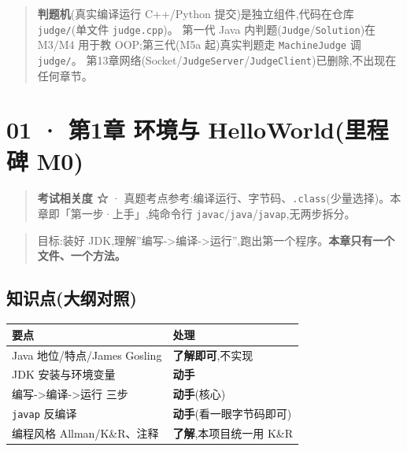 \documentclass[
  11pt,
]{ctexart}
\begin{document}
\begin{quote}
\textbf{判题机}(真实编译运行 C++/Python 提交)是独立组件,代码在仓库
\texttt{judge/}(单文件 \texttt{judge.cpp})。 第一代 Java
内判题(\texttt{Judge}/\texttt{Solution})在 M3/M4 用于教 OOP;第三代(M5a
起)真实判题走 \texttt{MachineJudge} 调 \texttt{judge/}。
第13章网络(Socket/\texttt{JudgeServer}/\texttt{JudgeClient})已删除,不出现在任何章节。
\end{quote}

\hypertarget{ux7b2c1ux7ae0-ux73afux5883ux4e0e-helloworldux91ccux7a0bux7891-m0}{%
\section{01 · 第1章 环境与 HelloWorld(里程碑
M0)}\label{ux7b2c1ux7ae0-ux73afux5883ux4e0e-helloworldux91ccux7a0bux7891-m0}}

\begin{quote}
\textbf{考试相关度 ☆} ·
真题考点参考:编译运行、字节码、\texttt{.class}(少量选择)。本章即「第一步·上手」,纯命令行
\texttt{javac}/\texttt{java}/\texttt{javap},无两步拆分。
\end{quote}

\begin{quote}
目标:装好
JDK,理解''编写-\textgreater 编译-\textgreater 运行'',跑出第一个程序。\textbf{本章只有一个文件、一个方法。}
\end{quote}

\hypertarget{ux77e5ux8bc6ux70b9ux5927ux7eb2ux5bf9ux7167}{%
\subsection{知识点(大纲对照)}\label{ux77e5ux8bc6ux70b9ux5927ux7eb2ux5bf9ux7167}}

\begin{longtable}[]{@{}ll@{}}
\toprule\noalign{}
要点 & 处理 \\
\midrule\noalign{}
\endhead
\bottomrule\noalign{}
\endlastfoot
Java 地位/特点/James Gosling & \textbf{了解即可},不实现 \\
JDK 安装与环境变量 & \textbf{动手} \\
编写-\textgreater 编译-\textgreater 运行 三步 & \textbf{动手}(核心) \\
\texttt{javap} 反编译 & \textbf{动手}(看一眼字节码即可) \\
编程风格 Allman/K\&R、注释 & \textbf{了解},本项目统一用 K\&R \\
\end{longtable}
\end{document}
